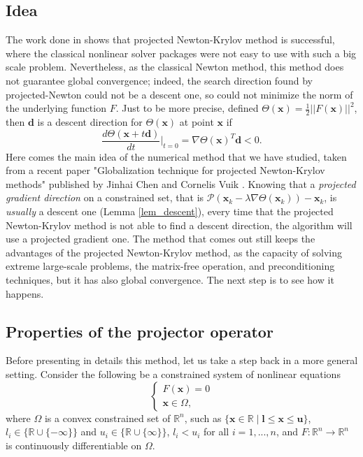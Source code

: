 \subsection{Idea}
The work done in \cite{before_MAIN} shows that projected Newton-Krylov method is successful, where the classical nonlinear solver packages were not easy to use with such a big scale problem. Nevertheless, as the classical Newton method, this method does not guarantee global convergence; indeed, the search direction found by projected-Newton could not be a descent one, so could not minimize the norm of the underlying function $F$. Just to be more precise, defined $ \Theta (\textbf{x}) = \frac{1}{2} ||F(\textbf{x})||^2$, then $\textbf{d} $ is a descent direction for $\Theta (\textbf{x})  $ at point $\textbf{x}$ if  
\begin{equation}
\label{descentcond}
\frac{d \Theta (\textbf{x} + t\textbf{d})}{dt} |_{t=0} = \nabla \Theta (\textbf{x})^T \textbf{d} < 0 .
\end{equation}
Here comes the main idea of the numerical method that we have studied, taken from a recent paper "Globalization technique for projected Newton-Krylov methods" published by Jinhai Chen and Cornelis Vuik \cite{MAIN}. Knowing that a \textit{projected gradient direction} on a constrained set, that is $ \mathcal{P}(\textbf{x}_k - \lambda \nabla \Theta (\textbf{x}_k)) - \textbf{x}_k $, is \textit{usually} a descent one (Lemma \ref{lem_descent}), every time that the projected Newton-Krylov method is not able to find a descent direction, the algorithm will use a projected gradient one. 
The method that comes out still keeps the advantages of the projected Newton-Krylov method, as the capacity of solving extreme large-scale problems, the matrix-free operation, and preconditioning techniques, but it has also global convergence. The next step is to see how it happens. 

\subsection{Properties of the projector operator}
Before presenting in details this method, let us take a step back in a more general setting. Consider the following be a constrained system of nonlinear equations
\begin{equation*}
\begin{cases}
F(\textbf{x}) = 0\\\textbf{x} \in \Omega,
\end{cases}
\end{equation*}
where $\Omega$ is a convex constrained set of $\mathbb{R}^{n}$, such as $ \{\textbf{x} \in \mathbb{R} \; | \; \textbf{l} \leq \textbf{x}\leq \textbf{u}\}$, $l_i \in \{ \mathbb{R} \cup \{-\infty \}\} $ and $ u_i \in \{ \mathbb{R} \cup \{\infty\} \} $, $ l_i < u_i $ for all $ i = 1,...,n $, and $ F: \mathbb{R}^n \rightarrow \mathbb{R}^n  $ is continuously differentiable on $ \Omega $.

